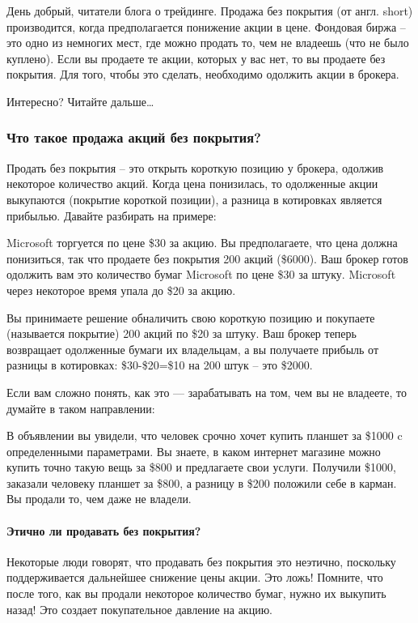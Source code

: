 \documentclass[a5paper]{article}
\begin{document}
День добрый, читатели блога о трейдинге. Продажа без покрытия (от англ. short) производится, когда предполагается понижение акции в цене. Фондовая биржа – это одно из немногих мест, где можно продать то, чем не владеешь (что не было куплено). Если вы продаете те акции, которых у вас нет, то вы продаете без покрытия. Для того, чтобы это сделать, необходимо одолжить акции в брокера.

Интересно? Читайте дальше…

\subsubsection{Что такое продажа акций без покрытия?}

Продать без покрытия – это открыть короткую позицию у брокера, одолжив некоторое количество акций. Когда цена понизилась, то одолженные акции выкупаются (покрытие короткой позиции), а разница в котировках является прибылью. Давайте разбирать на примере:

Microsoft торгуется по цене \$30 за акцию. Вы предполагаете, что цена должна понизиться, так что продаете без покрытия 200 акций (\$6000). Ваш брокер готов одолжить вам это количество бумаг Microsoft по цене \$30 за штуку. Microsoft через некоторое время упала до \$20 за акцию.

Вы принимаете решение обналичить свою короткую позицию и покупаете (называется покрытие) 200 акций по \$20 за штуку. Ваш брокер теперь возвращает одолженные бумаги их владельцам, а вы получаете прибыль от разницы в котировках: \$30-\$20=\$10 на 200 штук – это \$2000.

Если вам сложно понять, как это — зарабатывать на том, чем вы не владеете, то думайте в таком направлении:

В объявлении вы увидели, что человек срочно хочет купить планшет за
\$1000 c определенными параметрами. Вы знаете, в каком интернет
магазине  можно купить точно такую вещь за \$800 и предлагаете свои
услуги. Получили \$1000, заказали человеку планшет за \$800, а разницу в
\$200 положили себе в карман. Вы продали то, чем даже не владели.

\paragraph{Этично ли продавать без покрытия?}

Некоторые люди говорят, что продавать без покрытия это неэтично, поскольку поддерживается дальнейшее снижение цены акции. Это ложь! Помните, что после того, как вы продали некоторое количество бумаг, нужно их выкупить назад! Это создает покупательное давление на акцию.
\end{document}
